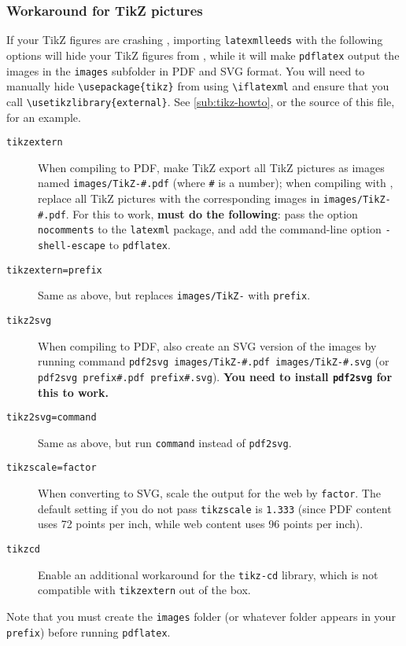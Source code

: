 \documentclass[a4paper]{article}
\def\ltxinline{\lstinline[style=latexml,frame=none]}
\theoremstyle{definition}
\begin{document}
\subsubsection{Workaround for TikZ pictures}
\label{ssub:TikZ}
If your TikZ figures are crashing \LaTeXML{}, importing \verb|latexmlleeds| with the following options will hide your TikZ figures from \LaTeXML{}, while it will make \verb|pdflatex| output the images in the \verb|images| subfolder in PDF and SVG format. You will need to manually hide \ltxinline|\usepackage{tikz}| from \LaTeXML{} using \ltxinline|\iflatexml| and ensure that you call \ltxinline|\usetikzlibrary{external}|. See \autoref{sub:tikz-howto}, or the source of this file, for an example.
\begin{description}
  \item[\texttt{tikzextern}] When compiling to PDF, make TikZ export all TikZ pictures as images named \verb|images/TikZ-#.pdf| (where \verb|#| is a number); when compiling with \LaTeXML{}, replace all TikZ pictures with the corresponding images in \verb|images/TikZ-#.pdf|. For this to work, \textbf{must do the following}: pass the option \verb|nocomments| to the \verb|latexml| package, and add the command-line option \verb|-shell-escape| to \verb|pdflatex|.
  \item[\texttt{tikzextern=prefix}] Same as above, but replaces \verb|images/TikZ-| with \verb|prefix|.
  \item[\texttt{tikz2svg}] When compiling to PDF, also create an SVG version of the images by running command \verb|pdf2svg images/TikZ-#.pdf images/TikZ-#.svg| (or \verb|pdf2svg prefix#.pdf prefix#.svg|). \textbf{You need to install \texttt{pdf2svg} for this to work.}
  \item[\texttt{tikz2svg=command}] Same as above, but run \verb|command| instead of \verb|pdf2svg|.
  \item[\texttt{tikzscale=factor}] When converting to SVG, scale the output for the web by \verb|factor|. The default setting if you do not pass \verb|tikzscale| is \verb|1.333| (since PDF content uses 72 points per inch, while web content uses 96 points per inch).
  \item[\texttt{tikzcd}] Enable an additional workaround for the \verb|tikz-cd| library, which is not compatible with \verb|tikzextern| out of the box.
\end{description}
Note that you must create the \verb|images| folder (or whatever folder appears in your \verb|prefix|) before running \verb|pdflatex|.
\end{document}

